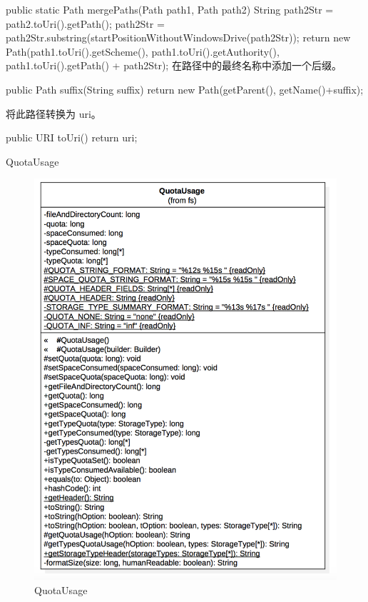 \begin{java}
	public static Path mergePaths(Path path1, Path path2) {
	  String path2Str = path2.toUri().getPath();
	  path2Str = path2Str.substring(startPositionWithoutWindowsDrive(path2Str));
	  return new Path(path1.toUri().getScheme(),
	      path1.toUri().getAuthority(),
	      path1.toUri().getPath() + path2Str);
	}
在路径中的最终名称中添加一个后缀。
\begin{java}
	public Path suffix(String suffix) {
	  return new Path(getParent(), getName()+suffix);
	}
\end{java}
将此路径转换为 uri。
\begin{java}
	public URI toUri() { return uri; }
\end{java}

QuotaUsage

\begin{figure}[h]
\centering
\includegraphics[width =1\linewidth]{8.png}
\caption{QuotaUsage}
\label{fig:QuotaUsage}
\end{figure}


\end{java}
